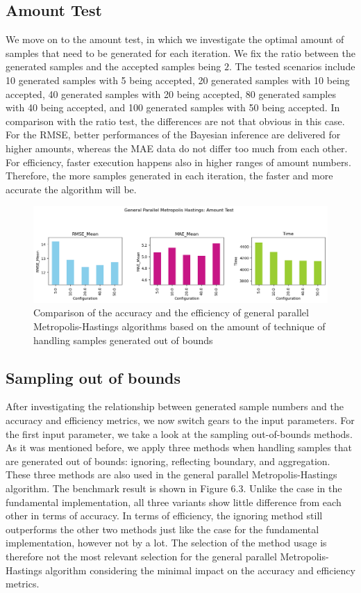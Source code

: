 \subsection{Amount Test}
We move on to the amount test, in which we investigate the optimal amount of samples that need to be generated for each iteration. We fix the ratio between the generated samples and the accepted samples being $2$. The tested scenarios include 10 generated samples with 5 being accepted, 20 generated samples with 10 being accepted, 40 generated samples with 20 being accepted, 80 generated samples with 40 being accepted, and 100 generated samples with 50 being accepted. In comparison with the ratio test, the differences are not that obvious in this case. For the RMSE, better performances of the Bayesian inference are delivered for higher amounts, whereas the MAE data do not differ too much from each other. For efficiency, faster execution happens also in higher ranges of amount numbers. Therefore, the more samples generated in each iteration, the faster and more accurate the algorithm will be.

\begin{figure}[H]
    \centering
    \includegraphics[width=1\textwidth]{figures/gpmh/amount_test.png}
    \captionsetup{width=.8\textwidth}
    \caption{Comparison of the accuracy and the efficiency of general parallel Metropolis-Hastings algorithms based on the amount of technique of handling samples generated out of bounds}
    \label{fig:enter-label}
\end{figure}

\subsection{Sampling out of bounds}
After investigating the relationship between generated sample numbers and the accuracy and efficiency metrics, we now switch gears to the input parameters. For the first input parameter, we take a look at the sampling out-of-bounds methods. As it was mentioned before, we apply three methods when handling samples that are generated out of bounds: ignoring, reflecting boundary, and aggregation. These three methods are also used in the general parallel Metropolis-Hastings algorithm. The benchmark result is shown in Figure 6.3. Unlike the case in the fundamental implementation, all three variants show little difference from each other in terms of accuracy. In terms of efficiency, the ignoring method still outperforms the other two methods just like the case for the fundamental implementation, however not by a lot. The selection of the method usage is therefore not the most relevant selection for the general parallel Metropolis-Hastings algorithm considering the minimal impact on the accuracy and efficiency metrics.


